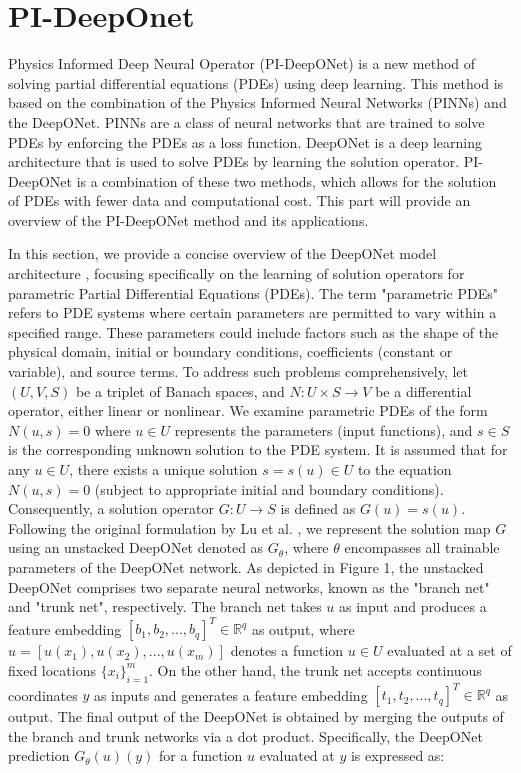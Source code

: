 \documentclass[a4paper, onecolumn, 12pt]{article}
\begin{document}
\clearpage
\section{PI-DeepOnet}
Physics Informed Deep Neural Operator (PI-DeepONet) is a new method of solving
partial differential equations (PDEs) using deep learning. This method is
based on the combination of the Physics Informed Neural Networks (PINNs)
and the DeepONet. PINNs are a class of neural networks that are trained
to solve PDEs by enforcing the PDEs as a loss function. DeepONet is
a deep learning architecture that is used to solve PDEs by learning
the solution operator. PI-DeepONet is a combination of these two 
methods, which allows for the solution of PDEs with fewer data and 
computational cost. This part
will provide an overview of the PI-DeepONet method and its applications.

In this section, we provide a concise overview of the DeepONet model architecture \cite{wang2021learning}, 
focusing specifically on the learning of solution operators for parametric Partial Differential Equations
(PDEs). The term "parametric PDEs" refers to PDE systems where certain parameters are permitted to vary 
within a specified range. These parameters could include factors such as the shape of the physical domain,
initial or boundary conditions, coefficients (constant or variable), and source terms. To address such 
problems comprehensively, let $(U, V, S)$ be a triplet of Banach spaces, and $N: U \times S \rightarrow
V$ be a differential operator, either linear or nonlinear. We examine parametric PDEs of the form 
$N(u, s) = 0$ \cite{wang2021learning} where $u \in U$ represents the parameters (input functions),
and $s \in S$ is the corresponding unknown solution to the PDE system. It is assumed that for any
$u \in U$, there exists a unique solution $s = s(u) \in U$ to the equation $N(u, s) = 0$ (subject to
appropriate initial and boundary conditions). Consequently, a solution operator $G: U \rightarrow S$ 
is defined as $G(u) = s(u)$. Following the original formulation by Lu et al. \cite{wang2021learning}, 
we represent the solution map $G$ using an unstacked DeepONet denoted as $G_{\theta}$, where $\theta$ 
encompasses all trainable parameters of the DeepONet network. As depicted in Figure 1, the unstacked
DeepONet comprises two separate neural networks, known as the "branch net" and "trunk net", respectively. 
The branch net takes $u$ as input and produces a feature embedding $[b_1, b_2, ..., b_q]^T \in \mathbb{R}^q$
as output, where $u = [u(x_1), u(x_2), ..., u(x_m)]$ denotes a function $u \in U$ evaluated at a set of 
fixed locations $\{x_i\}_{i=1}^m$. On the other hand, the trunk net accepts continuous coordinates $y$ as
inputs and generates a feature embedding $[t_1, t_2, ..., t_q]^T \in \mathbb{R}^q$ as output. The final 
output of the DeepONet is obtained by merging the outputs of the branch and trunk networks via a dot 
product. Specifically, the DeepONet prediction $G_{\theta}(u)(y)$ for a function $u$ evaluated at $y$
is expressed as:
\end{document}
